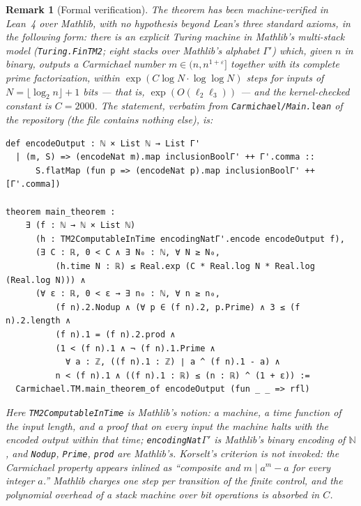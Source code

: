 \documentclass[11pt]{amsart}
\newtheorem{remark}[lemma]{Remark}
\newcommand{\llog}{\log\log}
\begin{document}
\begin{remark}[Formal verification]
\label{rem:lean}
The theorem has been machine-verified in Lean~4 over Mathlib, with no
hypothesis beyond Lean's three standard axioms, in the following form:
there is an explicit Turing machine in Mathlib's multi-stack model
(\texttt{Turing.FinTM2}; eight stacks over Mathlib's alphabet
$\Gamma'$) which, given $n$ in binary, outputs a Carmichael number
$m \in (n, n^{1+\varepsilon}]$ together with its complete prime
factorization, within $\exp(C \log N \cdot \llog N)$ steps for inputs
of $N = \lfloor \log_2 n \rfloor + 1$ bits --- that is,
$\exp(O(\ell_2\ell_3))$ --- and the kernel-checked constant is
$C = 2000$. The statement, verbatim from \texttt{Carmichael/Main.lean}
of the repository (the file contains nothing else), is:

\noindent\begin{minipage}{\linewidth}
\begin{lstlisting}
def encodeOutput : ℕ × List ℕ → List Γ'
  | (m, S) => (encodeNat m).map inclusionBoolΓ' ++ Γ'.comma ::
      S.flatMap (fun p => (encodeNat p).map inclusionBoolΓ' ++ [Γ'.comma])

theorem main_theorem :
    ∃ (f : ℕ → ℕ × List ℕ)
      (h : TM2ComputableInTime encodingNatΓ'.encode encodeOutput f),
      (∃ C : ℝ, 0 < C ∧ ∃ N₀ : ℕ, ∀ N ≥ N₀,
          (h.time N : ℝ) ≤ Real.exp (C * Real.log N * Real.log (Real.log N))) ∧
      (∀ ε : ℝ, 0 < ε → ∃ n₀ : ℕ, ∀ n ≥ n₀,
          (f n).2.Nodup ∧ (∀ p ∈ (f n).2, p.Prime) ∧ 3 ≤ (f n).2.length ∧
          (f n).1 = (f n).2.prod ∧
          (1 < (f n).1 ∧ ¬ (f n).1.Prime ∧
            ∀ a : ℤ, ((f n).1 : ℤ) ∣ a ^ (f n).1 - a) ∧
          n < (f n).1 ∧ ((f n).1 : ℝ) ≤ (n : ℝ) ^ (1 + ε)) :=
  Carmichael.TM.main_theorem_of encodeOutput (fun _ _ => rfl)
\end{lstlisting}
\end{minipage}

Here \texttt{TM2ComputableInTime} is Mathlib's notion: a machine, a
time function of the input length, and a proof that on every input the
machine halts with the encoded output within that time;
\texttt{encodingNat}$\Gamma'$ is Mathlib's binary encoding of $\mathbb{N}$, and
\texttt{Nodup}, \texttt{Prime}, \texttt{prod} are Mathlib's. Korselt's
criterion is not invoked: the Carmichael property appears inlined as
``composite and $m \mid a^m - a$ for every integer $a$.'' Mathlib
charges one step per transition of the finite control, and the
polynomial overhead of a stack machine over bit operations is absorbed
in $C$.


\end{remark}
\end{document}

